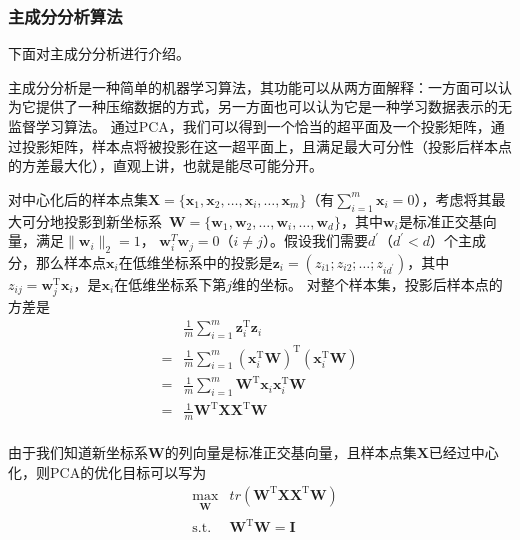 \documentclass[a4paper,AutoFakeBold,oneside,12pt]{book}
\begin{document}
\subsubsection{主成分分析算法}

下面对主成分分析进行介绍。

主成分分析是一种简单的机器学习算法，其功能可以从两方面解释：一方面可以认为它提供了一种压缩数据的方式，另一方面也可以认为它是一种学习数据表示的无监督学习算法。\cite{Goodfellow2016DeepLearning}
通过PCA，我们可以得到一个恰当的超平面及一个投影矩阵，通过投影矩阵，样本点将被投影在这一超平面上，且满足最大可分性（投影后样本点的方差最大化），直观上讲，也就是能尽可能分开。

对中心化后的样本点集$\bm{X}=\{\bm{x}_1,\bm{x}_2,\ldots,\bm{x}_i,\ldots,\bm{x}_m\}$（有$\sum_{i=1}^{m}\bm{x}_i = 0$），考虑将其最大可分地投影到新坐标系\ $\bm{W}= \{\bm{w}_1,\bm{w}_2,\ldots,\bm{w}_i,\ldots,\bm{w}_d\} $，其中$\bm{w}_i$是标准正交基向量，满足$\|\bm{w}_i\|_2 = 1$， $\bm{w}_i^T\bm{w}_j = 0$（$i \not= j$）。假设我们需要$d^\prime$（$d^\prime < d$）个主成分，那么样本点$\bm{x}_i$在低维坐标系中的投影是$\bm{z}_i = (z_{i1};z_{i2};\ldots;z_{id^\prime})$，其中$z_{ij} = \bm{w}_j^\mathrm{T}\bm{x}_i$，是$\bm{x}_i$在低维坐标系下第$j$维的坐标。
对整个样本集，投影后样本点的方差是
\begin{equation}
	\begin{aligned}
		  & \frac{1}{m}\sum_{i=1}^m \bm{z}_i^\mathrm{T}\bm{z}_i                                       \\
		= & \frac{1}{m}\sum_{i=1}^m (\bm{x}_i^\mathrm{T}\bm{W})^\mathrm{T}(\bm{x}_i^\mathrm{T}\bm{W}) \\
		= & \frac{1}{m}\sum_{i=1}^m \bm{W}^\mathrm{T}\bm{x}_i\bm{x}_i^\mathrm{T}\bm{W}                \\
		= & \frac{1}{m} \bm{W}^\mathrm{T}\bm{X}\bm{X}^\mathrm{T}\bm{W}                                \\
	\end{aligned}
\end{equation}

由于我们知道新坐标系$\bm{W}$的列向量是标准正交基向量，且样本点集$\bm{X}$已经过中心化，则PCA的优化目标可以写为
\begin{equation}
	\label{PCA_goal_TMP}
	\begin{aligned}
		 & \max_{\substack{\bm{W}}} & tr(\bm{W}^\mathrm{T}\bm{X}\bm{X}^ \mathrm{T}\bm{W}) \\
		 & \operatorname{ s.t. }    & \bm{W}^\mathrm{T}\bm{W} = \bm{I}                    \\
	\end{aligned}
\end{equation}
\end{document}
